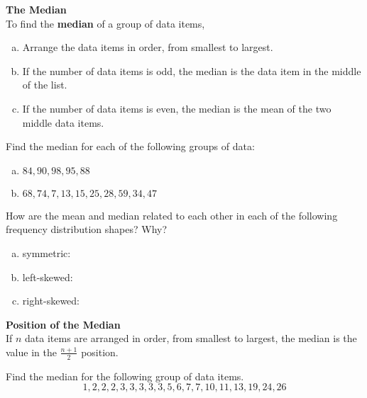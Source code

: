 \documentclass[12pt, letterpaper]{article}
\newcounter{exercise}
\theoremstyle{definition}
\begin{document}
\begin{tcolorbox}
\textbf{The Median}\\
To find the \textbf{median} of a group of data items,
\begin{enumerate}[(a)]
\item Arrange the data items in order, from smallest to largest.
\item If the number of data items is odd, the median is the data item in the middle of the list.
\item If the number of data items is even, the median is the mean of the two middle data items.
\end{enumerate}
\end{tcolorbox}


\begin{exercise}  Find the median for each of the following groups of data:
\begin{enumerate}[(a)]
\item $84,90,98,95,88$
\vfill
\item $68,74,7,13,15,25,28,59,34,47$
\vfill
\end{enumerate}
\end{exercise}

\vfill


\begin{exercise}
How are the mean and median related to each other in each of the following frequency distribution shapes?  Why?

\begin{enumerate}[(a)]

\item symmetric:
\vfill

\item left-skewed:
\vfill

\item right-skewed:
\vfill

\end{enumerate}

\end{exercise}

\vfill


\newpage


\begin{tcolorbox}
\textbf{Position of the Median}\\
If $n$ data items are arranged in order, from smallest to largest, the median is the value in the $\displaystyle \frac{n+1}{2}$ position.
\end{tcolorbox}

\begin{exercise}  Find the median for the following group of data items.
$$ 1,2,2,2,3,3,3,3,3,5,6,7,7,10,11,13,19,24,26 $$
\end{exercise}
\end{document}
